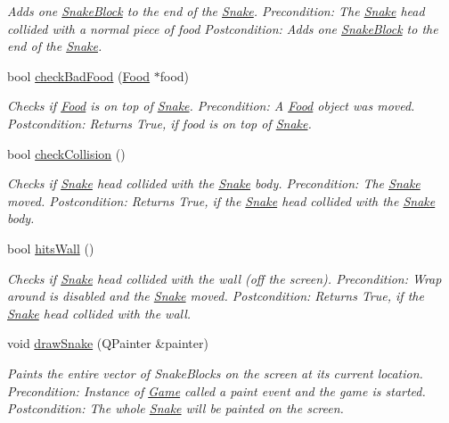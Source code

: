 \begin{DoxyCompactItemize}
\begin{DoxyCompactList}\small\item\em \-Adds one \hyperlink{classSnakeBlock}{\-Snake\-Block} to the end of the \hyperlink{classSnake}{\-Snake}. \-Precondition\-: \-The \hyperlink{classSnake}{\-Snake} head collided with a normal piece of food \-Postcondition\-: \-Adds one \hyperlink{classSnakeBlock}{\-Snake\-Block} to the end of the \hyperlink{classSnake}{\-Snake}. \end{DoxyCompactList}\item 
bool \hyperlink{classSnake_abc4975f0815e06bc9aae499c9ec4a1ad}{check\-Bad\-Food} (\hyperlink{classFood}{\-Food} $\ast$food)
\begin{DoxyCompactList}\small\item\em \-Checks if \hyperlink{classFood}{\-Food} is on top of \hyperlink{classSnake}{\-Snake}. \-Precondition\-: \-A \hyperlink{classFood}{\-Food} object was moved. \-Postcondition\-: \-Returns \-True, if food is on top of \hyperlink{classSnake}{\-Snake}. \end{DoxyCompactList}\item 
bool \hyperlink{classSnake_ac31845fa6830b6bba11cc7ed36e9ea74}{check\-Collision} ()
\begin{DoxyCompactList}\small\item\em \-Checks if \hyperlink{classSnake}{\-Snake} head collided with the \hyperlink{classSnake}{\-Snake} body. \-Precondition\-: \-The \hyperlink{classSnake}{\-Snake} moved. \-Postcondition\-: \-Returns \-True, if the \hyperlink{classSnake}{\-Snake} head collided with the \hyperlink{classSnake}{\-Snake} body. \end{DoxyCompactList}\item 
bool \hyperlink{classSnake_a30c2dd4b32595e3bc464229be093b9b0}{hits\-Wall} ()
\begin{DoxyCompactList}\small\item\em \-Checks if \hyperlink{classSnake}{\-Snake} head collided with the wall (off the screen). \-Precondition\-: \-Wrap around is disabled and the \hyperlink{classSnake}{\-Snake} moved. \-Postcondition\-: \-Returns \-True, if the \hyperlink{classSnake}{\-Snake} head collided with the wall. \end{DoxyCompactList}\item 
void \hyperlink{classSnake_a0eb0c03d97810d2f18480fdd376634fe}{draw\-Snake} (\-Q\-Painter \&painter)
\begin{DoxyCompactList}\small\item\em \-Paints the entire vector of \-Snake\-Blocks on the screen at its current location. \-Precondition\-: \-Instance of \hyperlink{classGame}{\-Game} called a paint event and the game is started. \-Postcondition\-: \-The whole \hyperlink{classSnake}{\-Snake} will be painted on the screen. \end{DoxyCompactList}\item 

\end{DoxyCompactItemize}
